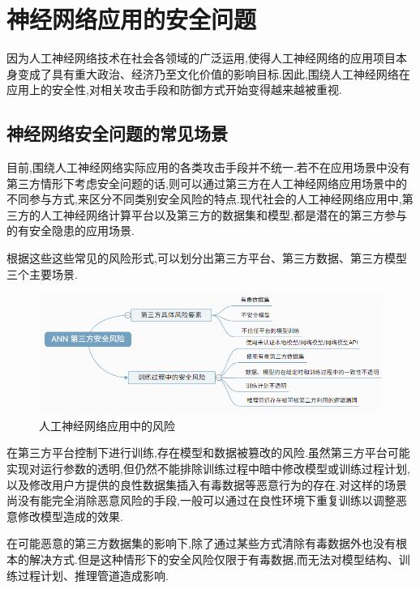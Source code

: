 \chapter{神经网络应用的安全问题}

因为人工神经网络技术在社会各领域的广泛运用,使得人工神经网络的应用项目本身变成了具有重大政治、经济乃至文化价值的影响目标.因此,围绕人工神经网络在应用上的安全性,对相关攻击手段和防御方式开始变得越来越被重视.

\section{神经网络安全问题的常见场景}

目前,围绕人工神经网络实际应用的各类攻击手段并不统一.若不在应用场景中没有第三方情形下考虑安全问题的话,则可以通过第三方在人工神经网络应用场景中的不同参与方式,来区分不同类别安全风险的特点.现代社会的人工神经网络应用中,第三方的人工神经网络计算平台以及第三方的数据集和模型,都是潜在的第三方参与的有安全隐患的应用场景.

根据这些这些常见的风险形式,可以划分出第三方平台、第三方数据、第三方模型三个主要场景.

\begin{figure}[H]
	\centering
	\includegraphics[scale=0.7]{Figures/situation.png}
	\caption{人工神经网络应用中的风险}
\end{figure}

在第三方平台控制下进行训练,存在模型和数据被篡改的风险.虽然第三方平台可能实现对运行参数的透明,但仍然不能排除训练过程中暗中修改模型或训练过程计划,以及修改用户方提供的良性数据集插入有毒数据等恶意行为的存在.对这样的场景尚没有能完全消除恶意风险的手段,一般可以通过在良性环境下重复训练以调整恶意修改模型造成的效果.

在可能恶意的第三方数据集的影响下,除了通过某些方式清除有毒数据外也没有根本的解决方式.但是这种情形下的安全风险仅限于有毒数据,而无法对模型结构、训练过程计划、推理管道造成影响.


